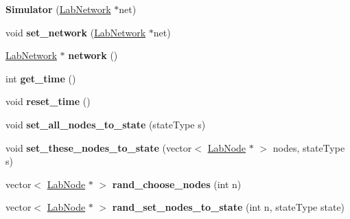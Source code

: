 \begin{DoxyCompactItemize}
\item 
\hypertarget{classstudy_1_1_simulator_aa5d9a9fc81da485befd28ef376aef28a}{{\bfseries Simulator} (\hyperlink{classelps_1_1_lab_network}{Lab\+Network} $\ast$net)}\label{classstudy_1_1_simulator_aa5d9a9fc81da485befd28ef376aef28a}

\item 
\hypertarget{classstudy_1_1_simulator_a39917e7291f8bc8429e3e951f3d5837c}{void {\bfseries set\+\_\+network} (\hyperlink{classelps_1_1_lab_network}{Lab\+Network} $\ast$net)}\label{classstudy_1_1_simulator_a39917e7291f8bc8429e3e951f3d5837c}

\item 
\hypertarget{classstudy_1_1_simulator_a08dfe98acc514199683e8c661266767e}{\hyperlink{classelps_1_1_lab_network}{Lab\+Network} $\ast$ {\bfseries network} ()}\label{classstudy_1_1_simulator_a08dfe98acc514199683e8c661266767e}

\item 
\hypertarget{classstudy_1_1_simulator_a652f8bf8f166c79beddbe39d03173b42}{int {\bfseries get\+\_\+time} ()}\label{classstudy_1_1_simulator_a652f8bf8f166c79beddbe39d03173b42}

\item 
\hypertarget{classstudy_1_1_simulator_a7edd7f723e605b445cb9d86bddc5c7f5}{void {\bfseries reset\+\_\+time} ()}\label{classstudy_1_1_simulator_a7edd7f723e605b445cb9d86bddc5c7f5}

\item 
\hypertarget{classstudy_1_1_simulator_a7797baa602429de21f082664ab3e142b}{void {\bfseries set\+\_\+all\+\_\+nodes\+\_\+to\+\_\+state} (state\+Type s)}\label{classstudy_1_1_simulator_a7797baa602429de21f082664ab3e142b}

\item 
\hypertarget{classstudy_1_1_simulator_ae7d25d625c5bd0b50fc3c27f77a659ce}{void {\bfseries set\+\_\+these\+\_\+nodes\+\_\+to\+\_\+state} (vector$<$ \hyperlink{classelps_1_1_lab_node}{Lab\+Node} $\ast$ $>$ nodes, state\+Type s)}\label{classstudy_1_1_simulator_ae7d25d625c5bd0b50fc3c27f77a659ce}

\item 
\hypertarget{classstudy_1_1_simulator_ab22adb38e6e960d0fc63d5cc64c332b1}{vector$<$ \hyperlink{classelps_1_1_lab_node}{Lab\+Node} $\ast$ $>$ {\bfseries rand\+\_\+choose\+\_\+nodes} (int n)}\label{classstudy_1_1_simulator_ab22adb38e6e960d0fc63d5cc64c332b1}

\item 
\hypertarget{classstudy_1_1_simulator_a2843066dc7f9997b7239830041d3342a}{vector$<$ \hyperlink{classelps_1_1_lab_node}{Lab\+Node} $\ast$ $>$ {\bfseries rand\+\_\+set\+\_\+nodes\+\_\+to\+\_\+state} (int n, state\+Type state)}\label{classstudy_1_1_simulator_a2843066dc7f9997b7239830041d3342a}


\end{DoxyCompactItemize}
